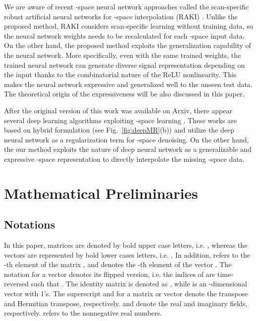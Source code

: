 \documentclass[10pt,journal]{IEEEtran}
\newcommand{\0}{{\boldsymbol{0}}}
\begin{document}
We are aware of recent -space neural network approaches called the scan-specific robust artificial neural networks for -space interpolation (RAKI)
\cite{akccakaya2019scan}. Unlike the proposed method, RAKI considers scan-specific learning without training data, so the neural network weights needs to 
be recalculated for each -space input data. On the other hand, the proposed method exploits the generalization capability of the neural network.  More specifically, even with the same trained weights, the trained neural network can generate diverse signal representation depending on the input  thanks to the combinatorial nature 
of the ReLU nonlinearity. This
 makes the neural network expressive and generalized well to the unseen test data. The theoretical origin of the expressiveness will be also discussed in this paper.

After the original version of this work was available on Arxiv,  there appear several  deep learning
algorithms exploiting -space learning \cite{pramanik2018off,aggarwal2018multi}. These works are based on  hybrid formulation (see Fig.~\ref{fig:deepMR}(b))  and utilize the
deep neural network as a regularization term for -space denoising. On the other hand,
 the our method
exploits the nature of  deep neural network as a generalizable and expressive -space representation to directly
interpolate the missing -space data.





\section{Mathematical Preliminaries}

\subsection{Notations}

In this paper, matrices are denoted by bold upper case letters, i.e. , whereas
the vectors are represented by bold lower cases letters, i.e. .
In addition,  refers to the -th element of the matrix , and  denotes the -th element of the 
vector .
The notation  for a vector  denotes its flipped version, i.e. the indices of  are time-reversed
such that .
The  identity matrix is denoted as , while  is an -dimensional vector
with 1's. 
The superscript  and  for a matrix or vector denote
the transpose and Hermitian transpose, respectively.
 and  denote the real and imaginary fields, respectively.
 refers to the nonnegative real numbers.
\end{document}
